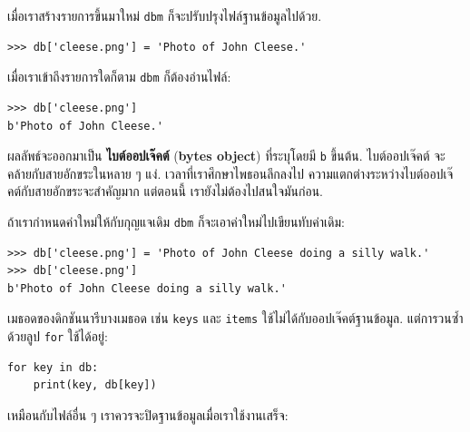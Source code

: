 เมื่อเราสร้างรายการขึ้นมาใหม่ \texttt{dbm} ก็จะปรับปรุงไฟล์ฐานข้อมูลไปด้วย.

\begin{verbatim}
>>> db['cleese.png'] = 'Photo of John Cleese.'
\end{verbatim}
%
%
เมื่อเราเข้าถึงรายการใดก็ตาม \texttt{dbm} ก็ต้องอ่านไฟล์:

\begin{verbatim}
>>> db['cleese.png']
b'Photo of John Cleese.'
\end{verbatim}
%
%
ผลลัพธ์จะออกมาเป็น \textbf{ไบต์ออปเจ๊คต์} (\textbf{bytes object})
ที่ระบุโดยมี \texttt{b} ขึ้นต้น.
ไบต์ออปเจ๊คต์ จะคล้ายกับสายอักขระในหลาย ๆ แง่.
เวลาที่เราศึกษาไพธอนลึกลงไป
ความแตกต่างระหว่างไบต์ออปเจ๊คต์กับสายอักขระจะสำคัญมาก
แต่ตอนนี้ เรายังไม่ต้องไปสนใจมันก่อน.


ถ้าเรากำหนดค่าใหม่ให้กับกุญแจเดิม 
\texttt{dbm} ก็จะเอาค่าใหม่ไปเขียนทับค่าเดิม:

\begin{verbatim}
>>> db['cleese.png'] = 'Photo of John Cleese doing a silly walk.'
>>> db['cleese.png']
b'Photo of John Cleese doing a silly walk.'
\end{verbatim}
%


เมธอดของดิกชันนารีบางเมธอด เช่น \texttt{keys} และ \texttt{items} ใช้ไม่ได้กับออปเจ๊คต์ฐานข้อมูล.
แต่การวนซ้ำด้วยลูป \texttt{for} ใช้ได้อยู่:

\begin{verbatim}
for key in db:
    print(key, db[key])
\end{verbatim}
%
%
เหมือนกับไฟล์อื่น ๆ
เราควรจะปิดฐานข้อมูลเมื่อเราใช้งานเสร็จ:

